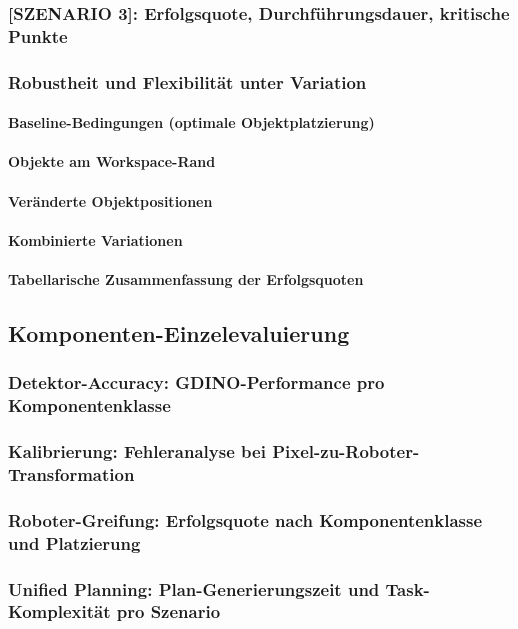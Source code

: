 \documentclass[12pt]{article}
\begin{document}
    \subsubsection{[SZENARIO 3]: Erfolgsquote, Durchführungsdauer, kritische Punkte}
    
    \subsubsection{Robustheit und Flexibilität unter Variation}
        \paragraph{Baseline-Bedingungen (optimale Objektplatzierung)}
        \paragraph{Objekte am Workspace-Rand}
        \paragraph{Veränderte Objektpositionen}
        \paragraph{Kombinierte Variationen}
        \paragraph{Tabellarische Zusammenfassung der Erfolgsquoten}

\subsection{Komponenten-Einzelevaluierung}
    \subsubsection{Detektor-Accuracy: GDINO-Performance pro Komponentenklasse}
    \subsubsection{Kalibrierung: Fehleranalyse bei Pixel-zu-Roboter-Transformation}
    \subsubsection{Roboter-Greifung: Erfolgsquote nach Komponentenklasse und Platzierung}
    \subsubsection{Unified Planning: Plan-Generierungszeit und Task-Komplexität pro Szenario}
\end{document}
